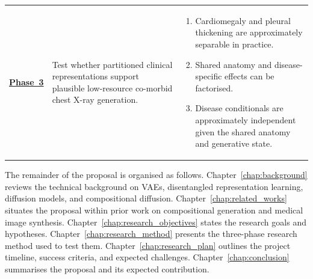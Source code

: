 \begin{table}[htbp]
\begin{tabularx}{\textwidth}{|>{\centering\arraybackslash}m{}|>{\raggedright\arraybackslash}p{}|>{\raggedright\arraybackslash}X|}
\begin{minipage}[t]{\hsize}
        \end{minipage} \\
        \hline
        \hyperref[sec:phase_3]{\textbf{Phase~3}} &
        Test whether partitioned clinical representations support plausible low-resource co-morbid chest X-ray generation. &
        \begin{minipage}[t]{\hsize}
            \vspace{1pt}
            \begin{enumerate}[leftmargin=*, nosep]
                \item Cardiomegaly and pleural thickening are approximately separable in practice.
                \item Shared anatomy and disease-specific effects can be factorised.
                \item Disease conditionals are approximately independent given the shared anatomy and generative state.
            \end{enumerate}
            \vspace{1pt}
        \end{minipage} \\
        \hline
    \end{tabularx}
\end{table}


The remainder of the proposal is organised as follows. Chapter~\ref{chap:background}
reviews the technical background on VAEs, disentangled representation learning, diffusion
models, and compositional diffusion. Chapter~\ref{chap:related_works} situates the
proposal within prior work on compositional generation and medical image synthesis.
Chapter~\ref{chap:research_objectives} states the research goals and hypotheses.
Chapter~\ref{chap:research_method} presents the three-phase research method used to test
them. Chapter~\ref{chap:research_plan} outlines the project timeline, success criteria,
and expected challenges. Chapter~\ref{chap:conclusion} summarises the proposal and its
expected contribution.
